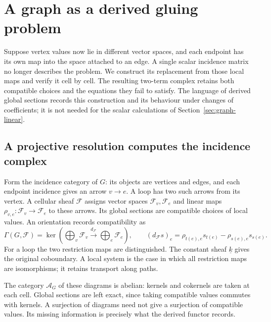 \documentclass[11pt]{article}
\theoremstyle{definition}
\theoremstyle{remark}
\begin{document}
\section{A graph as a derived gluing problem}
\label{sec:derived-gluing}

Suppose vertex values now lie in different vector spaces, and each endpoint has its own map into the space attached to an edge. A single scalar incidence matrix no longer describes the problem. We construct its replacement from those local maps and verify it cell by cell. The resulting two-term complex retains both compatible choices and the equations they fail to satisfy. The language of derived global sections records this construction and its behaviour under changes of coefficients; it is not needed for the scalar calculations of Section~\ref{sec:graph-linear}.

\subsection{A projective resolution computes the incidence complex}

Form the incidence category of $G$: its objects are vertices and edges, and each endpoint incidence gives an arrow $v\to e$. A loop has two such arrows from its vertex. A cellular sheaf $\mathcal F$ assigns vector spaces $\mathcal F_v,\mathcal F_e$ and linear maps $\rho_{v,e}:\mathcal F_v\to\mathcal F_e$ to these arrows. Its global sections are compatible choices of local values. An orientation records compatibility as
\[
 \Gamma(G,\mathcal F)=\ker\!\left(
 \bigoplus_v\mathcal F_v\xrightarrow{d_{\mathcal F}}
 \bigoplus_e\mathcal F_e\right),
 \qquad
 (d_{\mathcal F}s)_e=\rho_{t(e),e}s_{t(e)}-\rho_{s(e),e}s_{s(e)}.
\]
For a loop the two restriction maps are distinguished. The constant sheaf $\underline k$ gives the original coboundary. A local system is the case in which all restriction maps are isomorphisms; it retains transport along paths.

The category $\mathcal A_G$ of these diagrams is abelian: kernels and cokernels are taken at each cell. Global sections are left exact, since taking compatible values commutes with kernels. A surjection of diagrams need not give a surjection of compatible values. Its missing information is precisely what the derived functor records.
\end{document}
